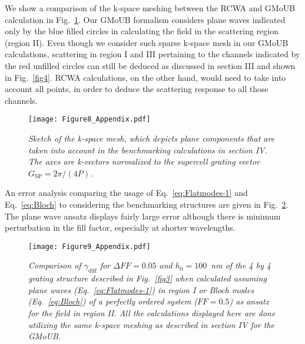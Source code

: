 \documentclass[ floatfix,reprint,amsmath,amssymb,aps,prb]{revtex4-1}
\begin{document}
We show a comparison of the k-space meshing between the RCWA and GMoUB calculation in Fig.~\ref{fig8}. Our GMoUB formalism considers plane waves indicated only by the blue filled circles in calculating the field in the scattering region (region II). Even though we consider such sparse k-space mesh in our GMoUB calculations, scattering in region I and III pertaining to the channels indicated by the red unfilled circles can still be deduced as discussed in section III and shown in Fig.~\ref{fig4}. RCWA calculations, on the other hand, would need to take into account all points, in order to deduce the scattering response to all those channels.
\begin{figure}[h!]

	\texttt{[image: Figure8\_Appendix.pdf]}
	\caption{\textit{Sketch of the k-space mesh, which depicts plane components that are taken into account in the benchmarking calculations in section IV. The axes are k-vectors normalized to the supercell grating vector $G_\mathrm{SP}=2\pi/(4P)$. }} \label{fig8}

\end{figure}

An error analysis comparing the usage of Eq.~\ref{eq:Flatmodes-1} and Eq.~\ref{eq:Bloch} to considering the benchmarking structures are given in Fig.~\ref{fig9}. The plane wave ansatz displays fairly large error  although there is minimum perturbation in the fill factor, especially at shorter wavelengths.
\begin{figure}[h!]

	\texttt{[image: Figure9\_Appendix.pdf]}
	\caption{\textit{ Comparison of $\gamma_\mathrm{diff}$ for $\Delta FF=0.05$ and $h_0=100$~nm of the 4 by 4 grating structure described in Fig.~\ref{fig3} when calculated assuming plane waves (Eq.~\ref{eq:Flatmodes-1}) in region I or Bloch modes (Eq.~\ref{eq:Bloch}) of a perfectly ordered system ($FF=0.5$) as ansatz for the field in region II. All the calculations displayed here are done utilizing the same k-space meshing as described in section IV for the GMoUB.}} \label{fig9}

\end{figure}

%

\end{document}
